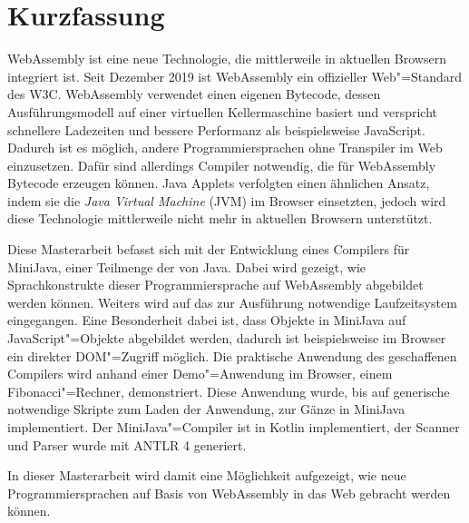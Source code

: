 \chapter{Kurzfassung}

WebAssembly ist eine neue Technologie, die mittlerweile in aktuellen Browsern integriert ist. Seit Dezember 2019 ist WebAssembly ein offizieller Web"=Standard des W3C. WebAssembly verwendet einen eigenen Bytecode, dessen Ausführungsmodell auf einer virtuellen Kellermaschine basiert und verspricht schnellere Ladezeiten und bessere Performanz als beispielsweise JavaScript. Dadurch ist es möglich, andere Programmiersprachen ohne Transpiler im Web einzusetzen. Dafür sind allerdings Compiler notwendig, die für WebAssembly Bytecode erzeugen können. Java Applets verfolgten einen ähnlichen Ansatz, indem sie die \emph{Java Virtual Machine} (JVM) im Browser einsetzten, jedoch wird diese Technologie mittlerweile nicht mehr in aktuellen Browsern unterstützt.

Diese Masterarbeit befasst sich mit der Entwicklung eines Compilers für MiniJava, einer Teilmenge der von Java. Dabei wird gezeigt, wie Sprachkonstrukte dieser Programmiersprache auf WebAssembly abgebildet werden können. Weiters wird auf das zur Ausführung notwendige Laufzeitsystem eingegangen. Eine Besonderheit dabei ist, dass Objekte in MiniJava auf JavaScript"=Objekte abgebildet werden, dadurch ist beispielsweise im Browser ein direkter DOM"=Zugriff möglich. Die praktische Anwendung des geschaffenen Compilers wird anhand einer Demo"=Anwendung im Browser, einem Fibonacci"=Rechner, demonstriert. Diese Anwendung wurde, bis auf generische notwendige Skripte zum Laden der Anwendung, zur Gänze in MiniJava implementiert. Der MiniJava"=Compiler ist in Kotlin implementiert, der Scanner und Parser wurde mit ANTLR 4 generiert.

In dieser Masterarbeit wird damit eine Möglichkeit aufgezeigt, wie neue Programmiersprachen auf Basis von WebAssembly in das Web gebracht werden können.
